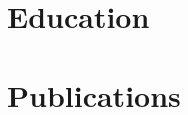 \documentclass[11pt, a4paper]{article}
\begin{document}
\section*{Education}
{\scriptsize
  \educationWithDuration
}

\section*{Publications}
{\tiny
  \publications
}

\end{document}
